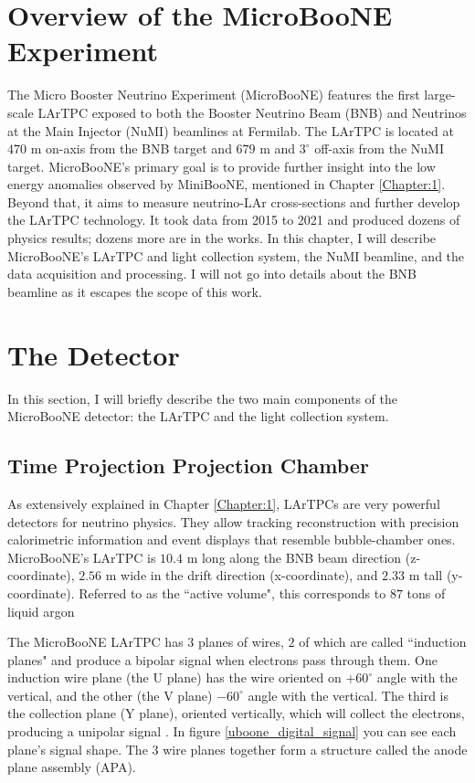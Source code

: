 \section{Overview of the MicroBooNE Experiment}
\label{Chapter:2}
The Micro Booster Neutrino Experiment (MicroBooNE) features the first large-scale LArTPC exposed to both the Booster Neutrino Beam (BNB) and Neutrinos at the Main Injector (NuMI) beamlines at Fermilab. The LArTPC is located at $470$ m on-axis from the BNB target and $679$ m and $3^{\circ}$ off-axis from the NuMI target. MicroBooNE's primary goal is to provide further insight into the low energy anomalies observed by MiniBooNE, mentioned in Chapter \ref{Chapter:1}. Beyond that, it aims to measure neutrino-LAr cross-sections and further develop the LArTPC technology. It took data from 2015 to 2021 and produced dozens of physics results; dozens more are in the works. 
In this chapter, I will describe MicroBooNE's LArTPC and light collection system, the NuMI beamline, and the data acquisition and processing. I will not go into details about the BNB beamline as it escapes the scope of this work.

\section{The Detector}

In this section, I will briefly describe the two main components of the MicroBooNE detector: the LArTPC and the light collection system.
\subsection{Time Projection Projection Chamber}
As extensively explained in Chapter \ref{Chapter:1}, LArTPCs are very powerful detectors for neutrino physics. They allow tracking reconstruction with precision calorimetric information and event displays that resemble bubble-chamber ones. MicroBooNE's LArTPC is $10.4$ m long along the BNB beam direction (z-coordinate), $2.56$ m wide in the drift direction (x-coordinate), and $2.33$ m tall (y-coordinate). Referred to as the ``active volume", this corresponds to $87$ tons of liquid argon 

The MicroBooNE LArTPC has $3$ planes of wires, $2$ of which are called ``induction planes" and produce a bipolar signal when electrons pass through them. One induction wire plane (the U plane) has the wire oriented on $+60^{\circ}$ angle with the vertical, and the other (the V plane) $-60^{\circ}$ angle with the vertical. The third is the collection plane (Y plane), oriented vertically, which will collect the electrons, producing a unipolar signal \cite{microboone_electronics}. In figure \ref{uboone_digital_signal} you can see each plane's signal shape. The $3$ wire planes together form a structure called the anode plane assembly (APA). 

